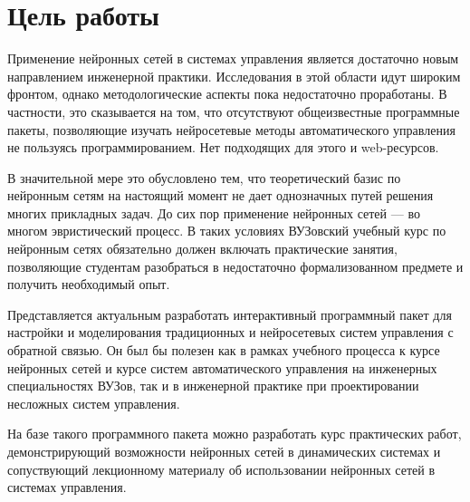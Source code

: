 

\section{Цель работы}

Применение нейронных сетей в системах управления является достаточно
новым направлением инженерной практики.  Исследования в этой области
идут широким фронтом, однако методологические аспекты пока
недостаточно проработаны.  В частности, это сказывается на том, что
отсутствуют общеизвестные программные пакеты, позволяющие изучать
нейросетевые методы автоматического управления не пользуясь
программированием.  Нет подходящих для этого и web-ресурсов.

В значительной мере это обусловлено тем, что теоретический базис по
нейронным сетям на настоящий момент не дает однозначных путей решения
многих прикладных задач.  До сих пор применение нейронных сетей --- во
многом эвристический процесс.  В таких условиях ВУЗовский учебный курс
по нейронным сетях обязательно должен включать практические занятия,
позволяющие студентам разобраться в недостаточно формализованном
предмете и получить необходимый опыт.

Представляется актуальным разработать интерактивный программный пакет
для настройки и моделирования традиционных и нейросетевых систем
управления с обратной связью.  Он был бы полезен как в рамках учебного
процесса к курсе нейронных сетей и курсе систем автоматического
управления на инженерных специальностях ВУЗов, так и в инженерной
практике при проектировании несложных систем управления.

На базе такого программного пакета можно разработать курс практических
работ, демонстрирующий возможности нейронных сетей в динамических
системах и сопуствующий лекционному материалу об использовании
нейронных сетей в системах управления.

